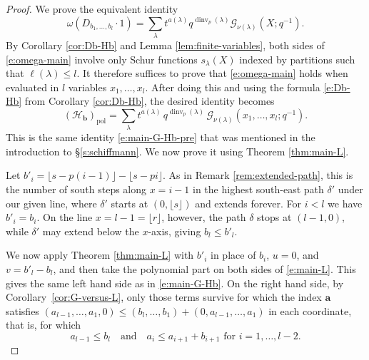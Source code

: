 \documentclass[12pt]{amsart}
\theoremstyle{definition}
\theoremstyle{remark}
\newcommand{\aA}{{\mathbf a}}
\newcommand{\bb}{{\mathbf b}}
\newcommand{\Gcal}{{\mathcal G}}
\newcommand{\Hcat}{{\mathcal H}}  %
\DeclareMathOperator{\dinv}{dinv}
\DeclareMathOperator{\pol}{pol}
\begin{document}
\begin{proof}
We prove the equivalent identity
\begin{equation}\label{e:omega-main}
\omega (D_{b_{1},\ldots,b_{l}} \cdot 1) = \sum _{\lambda } t^{a(\lambda )}
q^{\dinv _{p}(\lambda )} \Gcal_{\nu (\lambda )}(X;q^{-1}).
\end{equation}
By Corollary \ref{cor:Db-Hb} and Lemma \ref{lem:finite-variables},
both sides of \eqref{e:omega-main} involve only Schur functions
$s_{\lambda }(X)$ indexed by partitions such that $\ell(\lambda )\leq l$.
It therefore suffices to prove that \eqref{e:omega-main} holds when
evaluated in $l$ variables $x_{1},\ldots , x_{l}$.  After doing this
and using the formula \eqref{e:Db-Hb} from Corollary \ref{cor:Db-Hb},
the desired identity becomes
\begin{equation}\label{e:main-G-Hb}
(\Hcat _{\bb })_{\pol} = \sum _{\lambda } t^{a(\lambda )}\, q^{\dinv
_{p}(\lambda )}\, \Gcal _{\nu (\lambda )}(x_{1},\ldots,x_{l}; q^{-1}).
\end{equation}
This is the same identity \eqref{e:main-G-Hb-pre} that was mentioned
in the introduction to \S \ref{s:schiffmann}.  We now prove it using
Theorem \ref{thm:main-L}.

Let $b'_{i} = \lfloor s-p(i-1) \rfloor - \lfloor s-pi \rfloor$.  As in
Remark \ref{rem:extended-path}, this is the number of south steps
along $x = i-1$ in the highest south-east path $\delta '$ under our
given line, where $\delta '$ starts at $(0, \lfloor s \rfloor)$ and
extends forever.  For $i<l$ we have $b'_{i} = b_{i}$.  On the line
$x=l-1=\lfloor r \rfloor$, however, the path $\delta $ stops at
$(l-1,0)$, while $\delta '$ may extend below the $x$-axis, giving
$b_{l}\leq b'_{l}$.

We now apply Theorem \ref{thm:main-L} with $b'_{i}$ in place of
$b_{i}$, $u=0$, and $v = b'_{l} - b_{l}$, and then take the polynomial
part on both sides of \eqref{e:main-L}.  This gives the same left hand
side as in \eqref{e:main-G-Hb}.  On the right hand side, by
Corollary~\ref{cor:G-versus-L}, only those terms survive for which
the index $\aA $ satisfies $(a_{l-1},\ldots,a_{1},0)\leq
(b_{l},\ldots,b_{1})+(0, a_{l-1},\ldots,a_{1})$ in each coordinate,
that is, for which
\begin{equation}\label{e:area-columns}
a_{l-1}\leq b_{l}\quad \text{and}\quad a_{i}\leq a_{i+1} + b_{i+1}
\text{ for } i=1,\ldots,l-2.
\end{equation}


\end{proof}
\end{document}
